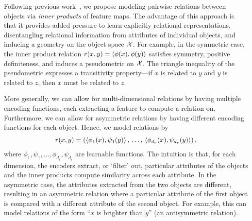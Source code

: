 Following previous work~\citep[e.g.,][]{webbEmergentSymbols2021, kergNeuralArchitecture2022, altabaaAbstractorsTransformer2023}, we propose modeling pairwise relations between objects via \textit{inner products} of feature maps.
The advantage of this approach is that it provides added pressure to learn explicitly relational representations, disentangling relational information from attributes of individual objects, and inducing a geometry on the object space ${\mathcal{X}}$.
For example, in the symmetric case, the inner product relation $r(x,y) = \left \langle \phi(x), \phi(y) \right\rangle$ satisfies symmetry, positive definiteness, and induces a pseudometric on ${\mathcal{X}}$. The triangle inequality of the pseudometric expresses a transitivity property---if $x$ is related to $y$ and $y$ is related to $z$, then $x$ must be related to $z$.

More generally, we can allow for multi-dimensional relations by having multiple encoding functions, each extracting a feature to compute a relation on. Furthermore, we can allow for asymmetric relations by having different encoding functions for each object. Hence, we model relations by
\begin{equation}\label{eq:relation_function}
    r(x, y) = \left(
        \left \langle \phi_1(x), \psi_1(y) \right\rangle,\, \ldots,\, \left \langle \phi_{d_r}(x), \psi_{d_r}(y) \right\rangle\right),
\end{equation}
where $\phi_1, \psi_1, \ldots, \phi_{d_r}, \psi_{d_r}$ are learnable functions. 
The intuition is that, for each dimension, the encoders extract, or `filter' out, particular attributes of the objects and the inner products compute similarity across each attribute.
In the asymmetric case, the attributes extracted from the two objects are different, resulting in an asymmetric relation where a particular attribute of the first object is compared with a different attribute of the second object. For example, this can model relations of the form ``$x$ is brighter than $y$'' (an antisymmetric relation).


